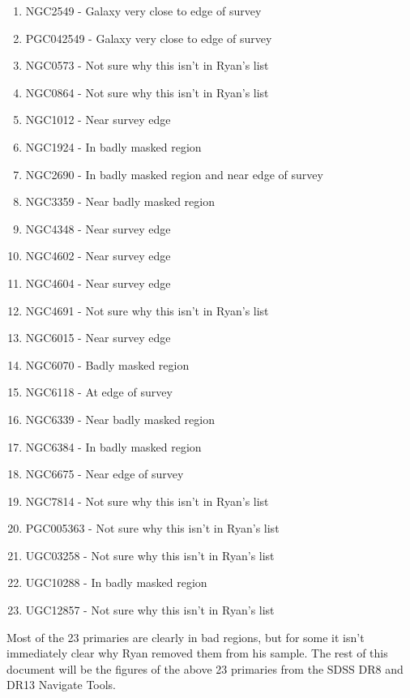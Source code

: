 \documentclass[10pt,letterpaper]{article}
\begin{document}
\begin{enumerate}
\item NGC2549 - Galaxy very close to edge of survey
\item PGC042549 - Galaxy very close to edge of survey
\item NGC0573 - Not sure why this isn't in Ryan's list
\item NGC0864 - Not sure why this isn't in Ryan's list
\item NGC1012 - Near survey edge
\item NGC1924 - In badly masked region
\item NGC2690 - In badly masked region and near edge of survey
\item NGC3359 - Near badly masked region
\item NGC4348 - Near survey edge
\item NGC4602 - Near survey edge
\item NGC4604 - Near survey edge
\item NGC4691 - Not sure why this isn't in Ryan's list
\item NGC6015 - Near survey edge
\item NGC6070 - Badly masked region
\item NGC6118 - At edge of survey
\item NGC6339 - Near badly masked region
\item NGC6384 - In badly masked region
\item NGC6675 - Near edge of survey
\item NGC7814 - Not sure why this isn't in Ryan's list
\item PGC005363 - Not sure why this isn't in Ryan's list
\item UGC03258 - Not sure why this isn't in Ryan's list
\item UGC10288 - In badly masked region
\item UGC12857 - Not sure why this isn't in Ryan's list
\end{enumerate}

Most of the 23 primaries are clearly in bad regions, but for some it isn't immediately clear why Ryan removed them from his sample. The rest of this document will be the figures of the above 23 primaries from the SDSS DR8 and DR13 Navigate Tools.\\

\newpage
\end{document}
